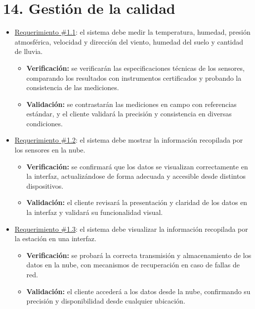 \documentclass[
11pt, %
]{charter}
\begin{document}
\section{14. Gestión de la calidad}
\label{sec:calidad}

\begin{itemize}
	\item \underline{Requerimiento \#1.1}: el sistema debe medir la temperatura, humedad, presión atmosférica, velocidad y dirección del viento, humedad del suelo y cantidad de lluvia.
		\begin{itemize}
			\item \textbf{Verificación:} se verificarán las especificaciones técnicas de los sensores, comparando los resultados con instrumentos certificados y probando la consistencia de las mediciones.
			\item \textbf{Validación:} se contrastarán las mediciones en campo con referencias estándar, y el cliente validará la precisión y consistencia en diversas condiciones.
		\end{itemize}
			
	\item \underline{Requerimiento \#1.2}: el sistema debe mostrar la información recopilada por los sensores en la nube.
		\begin{itemize}
			\item \textbf{Verificación:} se confirmará que los datos se visualizan correctamente en la interfaz, actualizándose de forma adecuada y accesible desde distintos dispositivos.
			\item \textbf{Validación:} el cliente revisará la presentación y claridad de los datos en la interfaz y validará su funcionalidad visual.
		\end{itemize}
			
	\item \underline{Requerimiento \#1.3}: el sistema debe visualizar la información recopilada por la estación en una interfaz.
		\begin{itemize}
			\item \textbf{Verificación:} se probará la correcta transmisión y almacenamiento de los datos en la nube, con mecanismos de recuperación en caso de fallas de red.
			\item \textbf{Validación:} el cliente accederá a los datos desde la nube, confirmando su precisión y disponibilidad desde cualquier ubicación.
		\end{itemize}

\newpage


\end{itemize}
\end{document}
